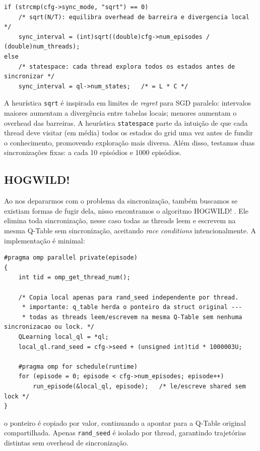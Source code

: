 \documentclass[12pt]{article}
\begin{document}
\begin{lstlisting}[caption={Calculo automatico do sync\_interval (train())}]
if (strcmp(cfg->sync_mode, "sqrt") == 0)
    /* sqrt(N/T): equilibra overhead de barreira e divergencia local */
    sync_interval = (int)sqrt((double)cfg->num_episodes / (double)num_threads);
else
    /* statespace: cada thread explora todos os estados antes de sincronizar */
    sync_interval = ql->num_states;   /* = L * C */
\end{lstlisting}

A heurística \texttt{sqrt} é inspirada em limites de \emph{regret} para SGD paralelo:
intervalos maiores aumentam a divergência entre tabelas locais; menores
aumentam o overhead das barreiras. A heurística \texttt{statespace} parte da
intuição de que cada thread deve visitar (em média) todos os estados do grid
uma vez antes de fundir o conhecimento, promovendo exploração mais
diversa. Além disso, testamos duas sincronizações fixas: a cada 10 episódios
e 1000 episódios.
\subsection{HOGWILD!}
\label{sec:orgde7dcd4}

Ao nos depararmos com o problema da sincronização, também buscamos se
existiam formas de fugir dela, nisso encontramos o algoritmo HOGWILD!
\cite{niu2011hogwild} . Ele elimina toda sincronização, nesse caso
todas as threads leem e escrevem na mesma Q-Table sem sincronização,
aceitando \emph{race conditions} intencionalmente. A implementação é minimal:

\begin{lstlisting}[caption={train\_hogwild com Q-Table compartilhada}]
#pragma omp parallel private(episode)
{
    int tid = omp_get_thread_num();

    /* Copia local apenas para rand_seed independente por thread.
     * importante: q_table herda o ponteiro da struct original ---
     * todas as threads leem/escrevem na mesma Q-Table sem nenhuma sincronizacao ou lock. */
    QLearning local_ql = *ql;
    local_ql.rand_seed = cfg->seed + (unsigned int)tid * 1000003U;

    #pragma omp for schedule(runtime)
    for (episode = 0; episode < cfg->num_episodes; episode++)
        run_episode(&local_ql, episode);   /* le/escreve shared sem lock */
}
\end{lstlisting}

 o ponteiro é copiado por valor, continuando a apontar para a Q-Table
original compartilhada. Apenas \texttt{rand\_seed} é isolado por thread,
garantindo trajetórias distintas sem overhead de sincronização.
\end{document}
